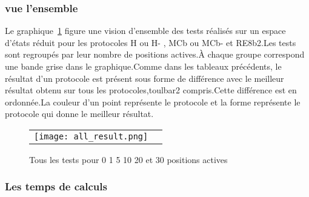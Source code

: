    \subsubsection{vue l'ensemble}

Le graphique~\ref{graph:all_result} figure une vision d'ensemble des tests réalisés sur un espace d'états réduit pour les protocoles H ou H- , MCb ou MCb- et RE8b2.Les tests sont regroupés par leur nombre de positions actives.À chaque groupe correspond une bande grise dans le graphique.Comme dans les tableaux précédents, le résultat d'un protocole est présent sous forme de différence avec le meilleur résultat obtenu sur tous les protocoles,toulbar2 compris.Cette différence est en ordonnée.La couleur d'un point représente le protocole et la forme représente le protocole qui donne le meilleur résultat.


    \begin{figure}[h]
      \centering
      \begin{tabular}{cc}
        \texttt{[image: all\_result.png]} 
      \end{tabular}
      
      \caption{Tous les tests pour 0 1 5 10 20 et 30 positions actives}
\label{graph:all_result}
    \end{figure}


    \subsubsection{Les temps de calculs} 

